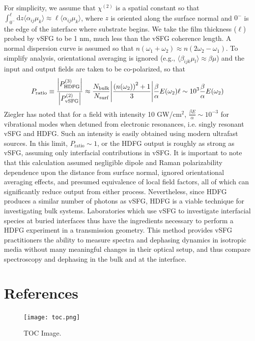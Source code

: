 \documentclass[aip, jcp, reprint, onecolumn, nofootinbib]{revtex4-2}
\begin{document}
For simplicity, we assume that $\chi^{(2)}$ is a spatial constant so that $\int_{0^-}^\ell \mathrm{d}z \langle \alpha_{ij}\mu_{k} \rangle \approx \ell \langle \alpha_{ij}\mu_{k} \rangle$, where $z$ is oriented along the surface normal and $0^{-}$ is the edge of the interface where substrate begins. 
We take the film thickness ($\ell$) probed by vSFG to be 1 nm, much less than the vSFG coherence length.\cite{RN133}
A normal dispersion curve is assumed so that $n(\omega_1+\omega_2) \approx n(2\omega_2-\omega_1)$.
To simplify analysis, orientational averaging is ignored (e.g., $\langle \beta_{ijk} \mu_{l} \rangle \approx \beta \mu$) and the input and output fields are taken to be co-polarized, so that
\begin{equation}
	P_\text{ratio} \equiv \frac{\abs{P^{(3)}_{\text{HDFG}}}}{\abs{P^{(2)}_{\text{vSFG}}}} \approx \frac{N_\text{bulk}}{N_\text{surf}} \abs{\frac{\left(n(\omega_2)\right)^2 + 1}{3}} \frac{\beta}{\alpha} E(\omega_2) \ell \sim 10^3 \frac{\beta}{\alpha} E(\omega_2)\\
\end{equation}
Ziegler has noted that for a field with intensity 10 GW/cm$^{2}$, $\frac{\beta E}{\alpha} \sim 10^{-3} $ for vibrational modes when detuned from electronic resonances, i.e. singly resonant vSFG and HDFG. \cite{RN515}
Such an intensity is easily obtained using modern ultrafast sources.
In this limit, $P_\text{ratio} \sim 1$, or the HDFG output is roughly as strong as vSFG, assuming only interfacial contributions in vSFG.
It is important to note that this calculation assumed negligible dipole and Raman polarizability dependence upon the distance from surface normal, ignored orientational averaging effects, and presumed equivalence of local field factors, all of which can significantly reduce output from either process. 
Nevertheless, since HDFG produces a similar number of photons as vSFG, HDFG is a viable technique for investigating bulk systems.
Laboratories which use vSFG to investigate interfacial species at buried interfaces thus have the ingredients necessary to perform a HDFG experiment in a transmission geometry. \cite{Piontek2023_1}
This method provides vSFG practitioners the ability to measure spectra and dephasing dynamics in isotropic media without many meaningful changes in their optical setup, and thus compare spectroscopy and dephasing in the bulk and at the interface.\cite{RN224}



\section{References}



\begin{figure}[!htbp]
	\centering
	\texttt{[image: toc.png]}
	\caption{
		TOC Image.
	} 
	\label{fig:toc}
\end{figure}
\end{document}
